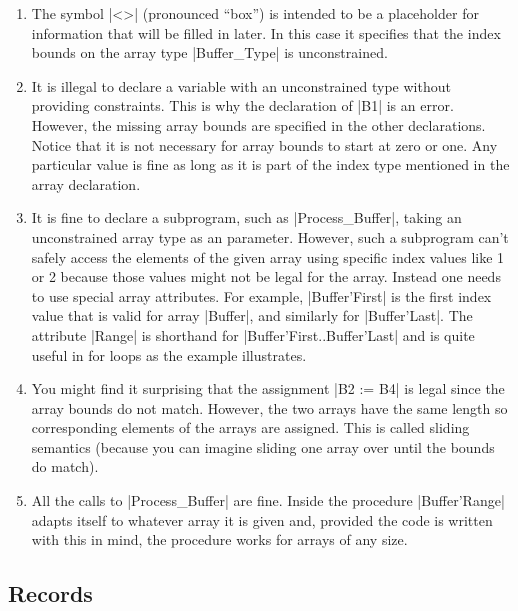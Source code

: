 \begin{enumerate}

\item The symbol |<>| (pronounced “box”) is intended to be a placeholder for information that
  will be filled in later. In this case it specifies that the index bounds on the array type
  |Buffer_Type| is unconstrained.

\item It is illegal to declare a variable with an unconstrained type without providing
  constraints. This is why the declaration of |B1| is an error. However, the missing array
  bounds are specified in the other declarations. Notice that it is not necessary for array
  bounds to start at zero or one. Any particular value is fine as long as it is part of the
  index type mentioned in the array declaration.

\item It is fine to declare a subprogram, such as |Process_Buffer|, taking an unconstrained
  array type as an parameter. However, such a subprogram can't safely access the elements of the
  given array using specific index values like 1 or 2 because those values might not be legal
  for the array. Instead one needs to use special array attributes. For example, |Buffer'First|
  is the first index value that is valid for array |Buffer|, and similarly for |Buffer'Last|.
  The attribute |Range| is shorthand for |Buffer'First..Buffer'Last| and is quite useful in for
  loops as the example illustrates.

\item You might find it surprising that the assignment |B2 := B4| is legal since the array
  bounds do not match. However, the two arrays have the same length so corresponding elements of
  the arrays are assigned. This is called sliding semantics (because you can imagine sliding one
  array over until the bounds do match).

\item All the calls to |Process_Buffer| are fine. Inside the procedure |Buffer'Range| adapts
  itself to whatever array it is given and, provided the code is written with this in mind, the
  procedure works for arrays of any size.

\end{enumerate}

\subsection{Records}

